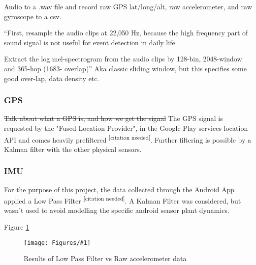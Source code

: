 \documentclass{UoNMCHA}
\newcommand{\citationneeded}{\textsuperscript{\color{blue} [citation needed]}}
\newcommand{\fref}[1] {Figure \ref{#1}}
\newcommand{\fFigure}[3]{
	\begin{figure}[h]
        \begin{center}  
            \texttt{[image: Figures/\#1]}  
            \caption{#2}
            \label{#1}
        \end{center}
	\end{figure}
}
\numberwithin{equation}{section}
\begin{document}
Audio to a .wav file and record raw GPS lat/long/alt, raw accelerometer, and raw gyroscope to a csv.  

“First, resample the audio clips at 22,050 Hz, because the high frequency part of sound signal is not useful for event detection in daily life

Extract the log mel-spectrogram from the audio clips by 128-bin, 2048-window and 365-hop (1683- overlap)”
Aka classic sliding window, but this specifies some good over-lap, data density etc.

\subsubsection{GPS}
\sout{Talk about what a GPS is, and how we get the signal}
The GPS signal is requested by the "Fused Location Provider", in the Google Play services location API and comes heavily prefiltered\citationneeded. Further filtering is possible by a Kalman filter with the other physical sensors.

\subsubsection{IMU}
For the purpose of this project, the data collected through the Android App applied a Low Pass Filter\citationneeded. A Kalman Filter was considered, but wasn't used to avoid modelling the specific android sensor plant dynamics.

\fref{AndroidDataExample.png}
\fFigure{AndroidDataExample.png}{Results of Low Pass Filter vs Raw accelerometer data}{0.8}




    
\end{document}
